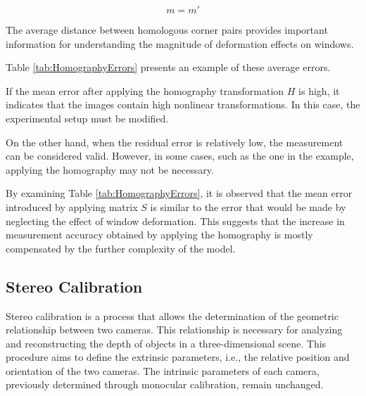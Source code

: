 \begin{equation}
  \label{eq:Homography3}
  m = m' 
\end{equation}

The average distance between homologous corner pairs provides important information for understanding the magnitude of deformation effects on windows.

Table \ref{tab:HomographyErrors} presents an example of these average errors.

\begin{table}[htbp]
  \centering
  \caption{Mean Errors in Warp Correction of Tunnel Windows.}
  \label{tab:HomographyErrors}
\end{table}

If the mean error after applying the homography transformation $H$ is high, it indicates that the images contain high nonlinear transformations. In this case, the experimental setup must be modified.  

On the other hand, when the residual error is relatively low, the measurement can be considered valid. However, in some cases, such as the one in the example, applying the homography may not be necessary. 
 
By examining Table \ref{tab:HomographyErrors}, it is observed that the mean error introduced by applying matrix $S$ is similar to the error that would be made by neglecting the effect of window deformation. This suggests that the increase in measurement accuracy obtained by applying the homography is mostly compensated by the further complexity of the model.  

\subsection{Stereo Calibration}
\label{sez:stereo_calibration}

Stereo calibration is a process that allows the determination of the geometric relationship between two cameras. This relationship is necessary for analyzing and reconstructing the depth of objects in a three-dimensional scene.  
This procedure aims to define the extrinsic parameters, i.e., the relative position and orientation of the two cameras.  
The intrinsic parameters of each camera, previously determined through monocular calibration, remain unchanged.

